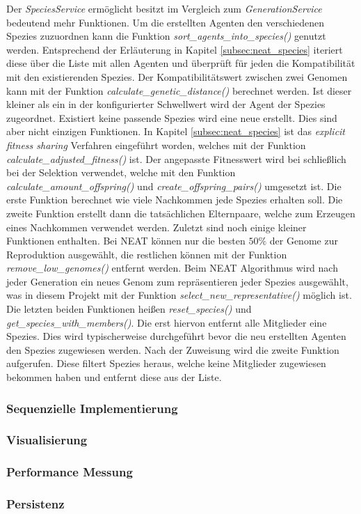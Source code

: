 Der \emph{SpeciesService} ermöglicht besitzt im Vergleich zum \emph{GenerationService} bedeutend mehr Funktionen. Um die erstellten Agenten den verschiedenen Spezies zuzuordnen kann die Funktion \emph{ sort\_agents\_into\_species()} genutzt werden. Entsprechend der Erläuterung in Kapitel \ref{subsec:neat_species} iteriert diese über die Liste mit allen Agenten und überprüft für jeden die Kompatibilität mit den existierenden Spezies. Der Kompatibilitätswert zwischen zwei Genomen kann mit der Funktion \emph{calculate\_genetic\_distance()} berechnet werden. Ist dieser kleiner als ein in der konfigurierter Schwellwert wird der Agent der Spezies zugeordnet. Existiert keine passende Spezies wird eine neue erstellt. Dies sind aber nicht einzigen Funktionen. In Kapitel \ref{subsec:neat_species} ist das \emph{explicit fitness sharing} Verfahren eingeführt worden, welches mit der Funktion \emph{calculate\_adjusted\_fitness()} ist. Der angepasste Fitnesswert wird bei schließlich bei der Selektion verwendet, welche mit den Funktion \emph{calculate\_amount\_offspring()} und \emph{create\_offspring\_pairs()} umgesetzt ist. Die erste Funktion berechnet wie viele Nachkommen jede Spezies erhalten soll. Die zweite Funktion erstellt dann die tatsächlichen Elternpaare, welche zum Erzeugen eines Nachkommen verwendet werden. Zuletzt sind noch einige kleiner Funktionen enthalten. Bei \ac{NEAT} können nur die besten $50\%$ der Genome zur Reproduktion ausgewählt, die restlichen können mit der Funktion \emph{remove\_low\_genomes()} entfernt werden. Beim \ac{NEAT} Algorithmus wird nach jeder Generation ein neues Genom zum repräsentieren jeder Spezies ausgewählt, was in diesem Projekt mit der Funktion \emph{select\_new\_representative()} möglich ist. Die letzten beiden Funktionen heißen \emph{reset\_species()} und \emph{get\_species\_with\_members()}. Die erst hiervon entfernt alle Mitglieder eine Spezies. Dies wird typischerweise durchgeführt bevor die neu erstellten Agenten den Spezies zugewiesen werden. Nach der Zuweisung wird die zweite Funktion aufgerufen. Diese filtert Spezies heraus, welche keine Mitglieder zugewiesen bekommen haben und entfernt diese aus der Liste. 

\subsubsection{Sequenzielle Implementierung}


\subsubsection{Visualisierung}
\subsubsection{Performance Messung}
\subsubsection{Persistenz}


